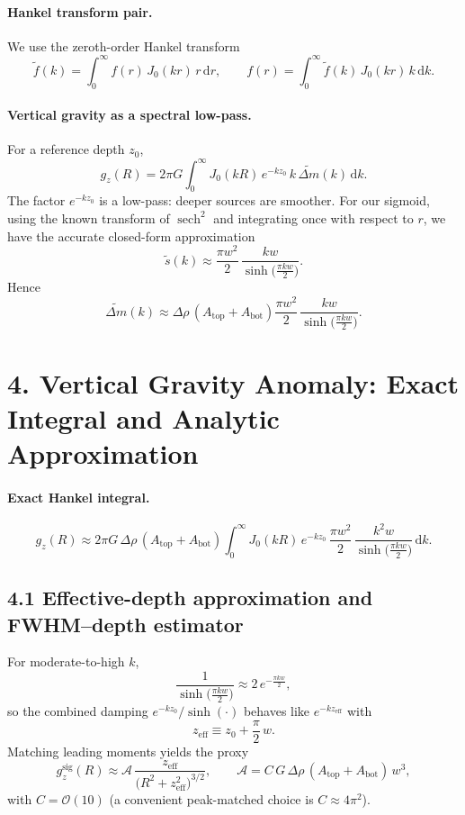 \documentclass[11pt,a4paper]{article}
\begin{document}
\paragraph{Hankel transform pair.}
We use the zeroth-order Hankel transform
\[
\widetilde{f}(k) = \int_0^\infty f(r)\,J_0(kr)\,r\,\mathrm{d}r,
\qquad
f(r) = \int_0^\infty \widetilde{f}(k)\,J_0(kr)\,k\,\mathrm{d}k.
\]

\paragraph{Vertical gravity as a spectral low-pass.}
For a reference depth $z_0$,
\[
g_z(R)
= 2\pi G \int_0^\infty J_0(kR)\, e^{-k z_0}\, k\, \widetilde{\Delta m}(k)\, \mathrm{d}k.
\]
The factor $e^{-k z_0}$ is a low-pass: deeper sources are smoother. For our sigmoid, using the known transform of $\operatorname{sech}^2$ and integrating once with respect to $r$, we have the accurate closed-form approximation
\[
\widetilde{s}(k)
\approx
\frac{\pi w^2}{2}\,\frac{k w}{\sinh\!\big(\tfrac{\pi k w}{2}\big)}.
\]
Hence
\[
\widetilde{\Delta m}(k)
\approx
\Delta\rho\,(A_{\mathrm{top}} + A_{\mathrm{bot}})
\frac{\pi w^2}{2}\,
\frac{k w}{\sinh\!\big(\tfrac{\pi k w}{2}\big)}.
\]

\section*{4. Vertical Gravity Anomaly: Exact Integral and Analytic Approximation}

\paragraph{Exact Hankel integral.}
\[
g_z(R)
\approx
2\pi G\,\Delta\rho\,(A_{\mathrm{top}} + A_{\mathrm{bot}})
\int_0^\infty
J_0(kR)\, e^{-k z_0}\,
\frac{\pi w^2}{2}\,
\frac{k^2 w}{\sinh\!\big(\tfrac{\pi k w}{2}\big)}
\, \mathrm{d}k.
\]

\subsection*{4.1 Effective-depth approximation and FWHM--depth estimator}

For moderate-to-high $k$,
\[
\frac{1}{\sinh\!\Big(\frac{\pi k w}{2}\Big)} \approx 2\,e^{-\frac{\pi k w}{2}},
\]
so the combined damping $e^{-k z_0}/\sinh(\cdot)$ behaves like $e^{-k z_{\mathrm{eff}}}$ with
\[
z_{\mathrm{eff}} \equiv z_0 + \frac{\pi}{2}\,w.
\]
Matching leading moments yields the proxy
\[
g_z^{\text{sig}}(R)
\approx
\mathcal{A}\,
\frac{z_{\mathrm{eff}}}{\big(R^2 + z_{\mathrm{eff}}^{2}\big)^{3/2}},
\qquad
\mathcal{A} = C\,G\,\Delta\rho\,(A_{\mathrm{top}} + A_{\mathrm{bot}})\,w^{3},
\]
with $C = \mathcal{O}(10)$ (a convenient peak-matched choice is $C\approx 4\pi^2$).
\end{document}
